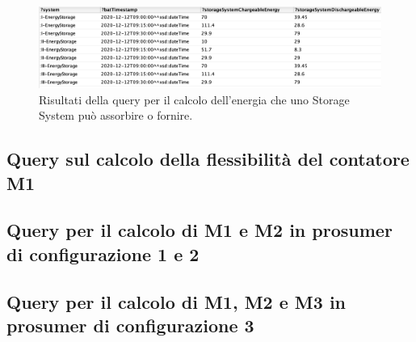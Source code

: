\begin{figure}[H]
    \centering
    \includegraphics[width=15cm]{images/subquery_res.png}
    \caption{Risultati della query per il calcolo dell'energia che uno Storage System può assorbire o fornire.}
    \label{fig:subquery_res}
\end{figure}

\subsection{Query sul calcolo della flessibilità del contatore M1}

\subsection{Query per il calcolo di M1 e M2 in prosumer di configurazione 1 e 2}

\subsection{Query per il calcolo di M1, M2 e M3 in prosumer di configurazione 3}